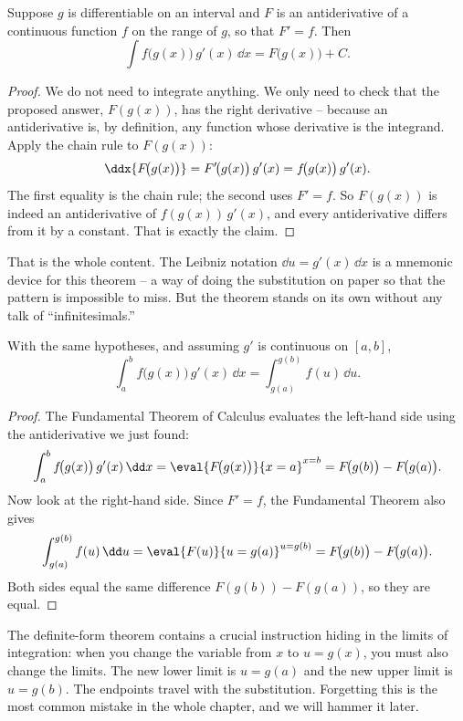 \begin{theorem}
\label{ch22:thm-indef}
Suppose $g$ is differentiable on an interval and $F$ is an antiderivative of a
continuous function $f$ on the range of $g$, so that $F' = f$. Then
\[
  \int f\!\big(g(x)\big)\,g'(x)\,\dd x = F\!\big(g(x)\big) + C.
\]
\end{theorem}

\begin{proof}
We do not need to integrate anything. We only need to check that the proposed
answer, $F(g(x))$, has the right derivative -- because an antiderivative is, by
definition, any function whose derivative is the integrand. Apply the chain rule
to $F(g(x))$:
\[
  \ddx{F\!\big(g(x)\big)} = F'\!\big(g(x)\big)\,g'(x) = f\!\big(g(x)\big)\,g'(x).
\]
The first equality is the chain rule; the second uses $F'=f$. So $F(g(x))$ is
indeed an antiderivative of $f(g(x))\,g'(x)$, and every antiderivative differs from
it by a constant. That is exactly the claim.
\end{proof}

That is the whole content. The Leibniz notation $\dd u = g'(x)\,\dd x$ is a
mnemonic device for this theorem -- a way of doing the substitution on paper so
that the pattern is impossible to miss. But the theorem stands on its own without
any talk of ``infinitesimals.''

\begin{theorem}
\label{ch22:thm-def}
With the same hypotheses, and assuming $g'$ is continuous on $[a,b]$,
\[
  \int_a^b f\!\big(g(x)\big)\,g'(x)\,\dd x
   = \int_{g(a)}^{g(b)} f(u)\,\dd u.
\]
\end{theorem}

\begin{proof}
The Fundamental Theorem of Calculus evaluates the left-hand side using the
antiderivative we just found:
\[
  \int_a^b f\!\big(g(x)\big)\,g'(x)\,\dd x
   = \eval{F\!\big(g(x)\big)}{x=a}^{x=b}
   = F\!\big(g(b)\big) - F\!\big(g(a)\big).
\]
Now look at the right-hand side. Since $F'=f$, the Fundamental Theorem also gives
\[
  \int_{g(a)}^{g(b)} f(u)\,\dd u = \eval{F(u)}{u=g(a)}^{u=g(b)}
   = F\!\big(g(b)\big) - F\!\big(g(a)\big).
\]
Both sides equal the same difference $F(g(b)) - F(g(a))$, so they are equal.
\end{proof}

\begin{focusbox}
The definite-form theorem contains a crucial instruction hiding in the limits of
integration: when you change the variable from $x$ to $u = g(x)$, you must also
change the limits. The new lower limit is $u = g(a)$ and the new upper limit is
$u = g(b)$. The endpoints travel with the substitution. Forgetting this is the most
common mistake in the whole chapter, and we will hammer it later.
\end{focusbox}

